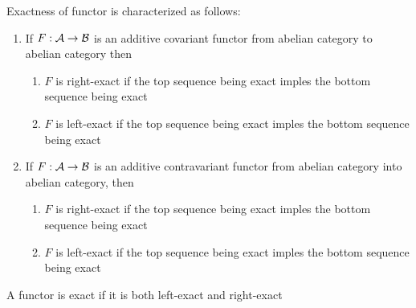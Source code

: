 \begin{definition}
	Exactness of functor is characterized as follows:
	\begin{enumerate}
		\item If $F: \mathcal{A} \to \mathcal{B}$ is an additive covariant functor from abelian category to abelian category then
		\begin{enumerate}
			\item $F$ is right-exact if the top sequence being exact imples the bottom sequence being exact
			\begin{center}
			\end{center}
			
			\item $F$ is left-exact if the top sequence being exact imples the bottom sequence being exact
			\begin{center}
			\end{center}
		\end{enumerate}
		
		\item If $F: \mathcal{A} \to \mathcal{B}$ is an additive contravariant functor from abelian category into abelian category, then
		\begin{enumerate}
			\item $F$ is right-exact if the top sequence being exact imples the bottom sequence being exact
			\begin{center}
			\end{center}
			
			\item $F$ is left-exact if the top sequence being exact imples the bottom sequence being exact
			\begin{center}
			\end{center}
		\end{enumerate}
	\end{enumerate}
	
	A functor is exact if it is both left-exact and right-exact
\end{definition}

